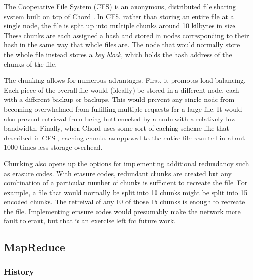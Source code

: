 \documentclass[conference, compsocconf, letterpaper]{IEEEtran}
\begin{document}
The Cooperative File System (CFS) is an anonymous, distributed file sharing system built on top of Chord \cite{CFS}.  In CFS, rather than storing an entire file at a single node, the file is split up into multiple chunks around 10 kilbytes in size.  These chunks are each assigned a hash and stored in nodes corresponding to their hash in the same way that whole files are.  The node that would normally store the whole file instead stores a \emph{key block}, which holds the hash address of the chunks of the file. 

The chunking allows for numerous advantages.  First, it promotes load balancing. Each piece of the overall file would (ideally) be stored in a different node, each with a different backup or backups.  This would prevent any single node from becoming overwhelmed from fulfilling multiple requests for a large file.  It would also prevent retrieval from being bottlenecked by a node with a relatively low bandwidth. Finally, when Chord uses some sort of caching scheme like that described in CFS \cite{CFS}, caching chunks as opposed to the entire file resulted in about 1000 times less storage overhead.  


Chunking also opens up the options for implementing additional redundancy such as erasure codes\cite{rizzo1997effective}. With erasure codes, redundant chunks are created but any combination of a particular number of chunks is sufficient to recreate the file.  For example, a file that would normally be split into 10 chunks might be split into 15 encoded chunks.  The retreival of any 10 of those 15 chunks is enough to recreate the file.  Implementing erasure codes would presumably make the network more fault tolerant, but that is an exercise left for future work.





\subsection{MapReduce}



\subsubsection{History}
\end{document}
